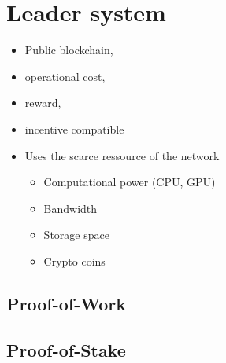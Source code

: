 \section{Leader system}\label{sec:leader}
\begin{itemize}
\item Public blockchain, 
\item operational cost, 
\item reward, 
\item incentive compatible
\item Uses the scarce ressource of the network
\begin{itemize}
	\item Computational power (CPU, GPU)
	\item Bandwidth
	\item Storage space
	\item Crypto coins
\end{itemize}
\end{itemize}
\subsection{Proof-of-Work}\label{ssec:pow}
\subsection{Proof-of-Stake}\label{ssec:pos}

